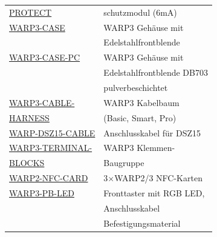 \documentclass[a4paper,10pt]{article}
\begin{document}
\begin{multicols*}{2}
{\begin{tabular}{ll}
        \href{https://www.tinkerforge.com/de/shop/warp/warp3-spare-parts/}{PROTECT}                                                 & schutzmodul (6mA)                    \\
        \cmidrule(lr{0.5em}){1-2}
        \href{https://www.tinkerforge.com/de/shop/warp/warp3-spare-parts/}{WARP3-CASE} 												& WARP3 Gehäuse mit\\
																																	& Edelstahlfrontblende                        \\
        \cmidrule(lr{0.5em}){1-2}
        \href{https://www.tinkerforge.com/de/shop/warp/warp3-spare-parts/}{WARP3-CASE-PC}											& WARP3 Gehäuse mit\\
																																	& Edelstahlfrontblende DB703 \\
																																	& pulverbeschichtet \\
        \cmidrule(lr{0.5em}){1-2}
        \href{https://www.tinkerforge.com/de/shop/warp/warp3-spare-parts/}{WARP3-CABLE-}										& WARP3 Kabelbaum           \\
        \href{https://www.tinkerforge.com/de/shop/warp/warp3-spare-parts/}{HARNESS}										        & (Basic, Smart, Pro)           \\
        \cmidrule(lr{0.5em}){1-2}
        \href{https://www.tinkerforge.com/de/shop/warp/warp3-spare-parts/}{WARP-DSZ15-CABLE}										& Anschlusskabel für DSZ15                      \\
        \cmidrule(lr{0.5em}){1-2}
        \href{https://www.tinkerforge.com/de/shop/warp/warp3-spare-parts/}{WARP3-TERMINAL-}											& WARP3 Klemmen-                       \\
        \href{https://www.tinkerforge.com/de/shop/warp/warp3-spare-parts/}{BLOCKS}  							                    & Baugruppe                            \\
        \cmidrule(lr{0.5em}){1-2}
        \href{https://www.tinkerforge.com/de/shop/warp/warp3-spare-parts/}{WARP2-NFC-CARD}											& 3$\times$WARP2/3 NFC-Karten            \\
        \cmidrule(lr{0.5em}){1-2}
        \href{https://www.tinkerforge.com/de/shop/warp/warp3-spare-parts/}{WARP3-PB-LED}											& Fronttaster mit RGB LED,                     \\
																																	& Anschlusskabel			\\
																																	& Befestigungsmaterial			\\
        \cmidrule(lr{0.5em}){1-2}

\end{tabular}}
\end{multicols*}
\end{document}

